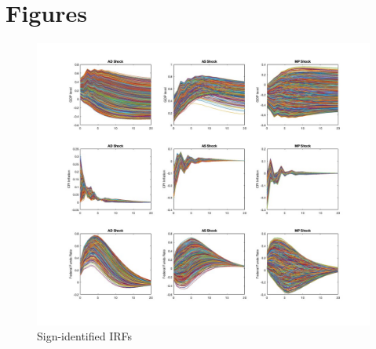 \documentclass{article}
\begin{document}
\newpage

\section{Figures}
\begin{figure}[htbp]\caption[]{Sign-identified IRFs}\label{fig:signSVAR}
	\includegraphics[width=\textwidth]{plots/signIRFs.jpg}
\end{figure}
\end{document}
